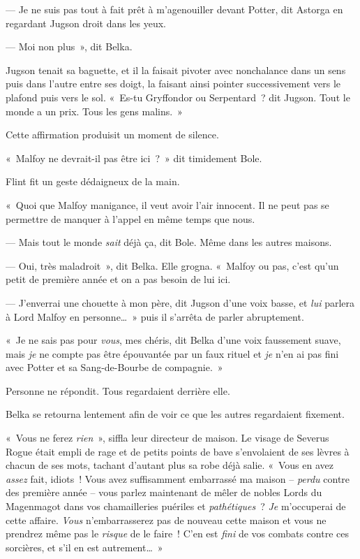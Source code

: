 --- Je ne suis pas tout à fait prêt à m'agenouiller devant Potter, dit Astorga en regardant Jugson droit dans les yeux.

--- Moi non plus~», dit Belka.

Jugson tenait sa baguette, et il la faisait pivoter avec nonchalance dans un sens puis dans l'autre entre ses doigt, la faisant ainsi pointer successivement vers le plafond puis vers le sol. «~Es-tu Gryffondor ou Serpentard~? dit Jugson. Tout le monde a un prix. Tous les gens malins.~»

Cette affirmation produisit un moment de silence.

«~Malfoy ne devrait-il pas être ici~?~» dit timidement Bole.

Flint fit un geste dédaigneux de la main.

«~Quoi que Malfoy manigance, il veut avoir l'air innocent. Il ne peut pas se permettre de manquer à l'appel en même temps que nous.

--- Mais tout le monde \emph{sait} déjà ça, dit Bole. Même dans les autres maisons.

--- Oui, très maladroit~», dit Belka. Elle grogna. «~Malfoy ou pas, c'est qu'un petit de première année et on a pas besoin de lui ici.

--- J'enverrai une chouette à mon père, dit Jugson d'une voix basse, et \emph{lui} parlera à Lord Malfoy en personne…~» puis il s'arrêta de parler abruptement.

«~Je ne sais pas pour \emph{vous}, mes chéris, dit Belka d'une voix faussement suave, mais \emph{je} ne compte pas être épouvantée par un faux rituel et \emph{je} n'en ai pas fini avec Potter et sa Sang-de-Bourbe de compagnie.~»

Personne ne répondit. Tous regardaient derrière elle.

Belka se retourna lentement afin de voir ce que les autres regardaient fixement.

«~Vous ne ferez \emph{rien}~», siffla leur directeur de maison. Le visage de Severus Rogue était empli de rage et de petits points de bave s'envolaient de ses lèvres à chacun de ses mots, tachant d'autant plus sa robe déjà salie. «~Vous en avez \emph{assez} fait, idiots~! Vous avez suffisamment embarrassé ma maison -- \emph{perdu} contre des première année -- vous parlez maintenant de mêler de nobles Lords du Magenmagot dans vos chamailleries puériles et \emph{pathétiques}~? \emph{Je} m'occuperai de cette affaire. \emph{Vous} n'embarrasserez pas de nouveau cette maison et vous ne prendrez même pas le \emph{risque} de le faire~! C'en est \emph{fini} de vos combats contre ces sorcières, et s'il en est autrement…~»

